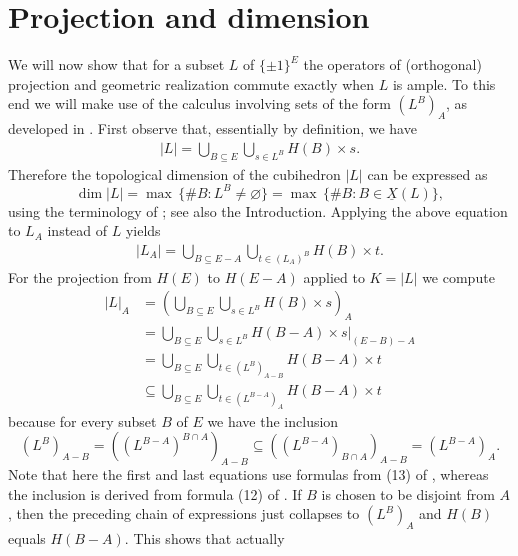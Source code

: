 \documentclass[11pt,a4paper]{amsart}
\theoremstyle{definition}
\numberwithin{equation}{section}
\newcommand{\covectors}{\ensuremath{L}}
\newcommand{\X}{\ensuremath{X}}
\newcommand{\HH}{\ensuremath{H}}
\begin{document}
\section{Projection and dimension}\label{projection}

We will now show that for a subset $\covectors$ of $\{ \pm 1\}^E$ the operators of (orthogonal) projection and geometric
realization commute exactly when $\covectors$ is ample. To this end we will make use of the calculus involving sets of the form $({\covectors}^B)_A$, as developed
in \cite{BaChDrKo}. First observe that, essentially by definition, we have
\begin{align*}
|{\covectors}|=\bigcup \limits _{B\subseteq E}\bigcup \limits
 _{s\in {\covectors}^B}\HH(B) \times s. \tag{1}
\end{align*}
Therefore the topological dimension of the cubihedron $|\covectors|$ can be expressed as
$$\dim |{\covectors}|=\max \,\{ \#B: {\covectors}^B\ne
\varnothing \}=\max \,\{ \# B: B\in \underline{{\X}}({\covectors})\},$$
using the terminology of \cite{BaChDrKo}; see also the Introduction. Applying the above equation to ${\covectors}_A$ instead of $\covectors$ yields
\begin{align*}
 |{\covectors}_A|=\bigcup \limits _{B\subseteq E-A}\bigcup \limits _{t\in
 ({\covectors}_A)^B}\HH(B)\times t. \tag{2}
\end{align*}
For the projection from $\HH(E)$ to ${\HH}(E-A)$ applied to $K=|\covectors|$ we compute
\begin{align*}
|{\covectors}|_A&=\left(\bigcup_{B\subseteq E}\bigcup_{s\in {\covectors}^B} \HH(B)\times s\right)_A\\
&=\bigcup_{B\subseteq E}\bigcup_{s\in {\covectors}^B}\HH(B-A)\times s|_{(E-B)-A}\\
&=\bigcup_{B\subseteq E}\bigcup_{t\in ({\covectors}^B)_{A-B}}\HH(B-A)\times t\\
&\subseteq \bigcup_{B\subseteq E}\bigcup_{t\in (\covectors^{B-A})_A}\HH(B-A)\times t
\end{align*}
because for every subset $B$ of $E$ we have the inclusion
$$({\covectors}^B)_{A - B}=(({\covectors}^{B - A})^{B\cap A})_{A-
  B}\subseteq (({\covectors}^{B- A})_{B\cap A})_{A- B}=({\covectors}^{B - A})_A.$$
Note that here the first and last equations use formulas from (13) of \cite{BaChDrKo}, whereas the inclusion is
derived from formula (12) of \cite{BaChDrKo}. If $B$ is chosen to be disjoint from $A$, then the preceding chain
of expressions just collapses to $(\covectors^B)_A$ and $\HH(B)$ equals $\HH(B-A).$ This shows that actually
\end{document}
